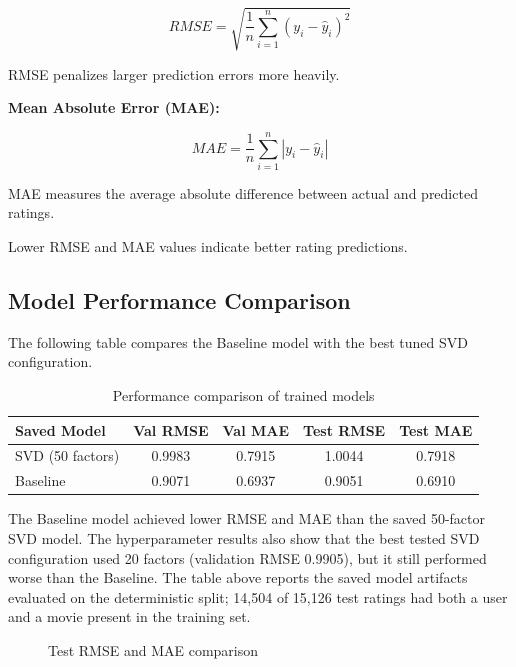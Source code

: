 \documentclass[11pt,a4paper]{article}
\begin{document}
\begin{equation}
RMSE = \sqrt{\frac{1}{n}\sum_{i=1}^{n}(y_i-\hat{y}_i)^2}
\end{equation}

RMSE penalizes larger prediction errors more heavily.

\textbf{Mean Absolute Error (MAE):}

\begin{equation}
MAE = \frac{1}{n}\sum_{i=1}^{n}|y_i-\hat{y}_i|
\end{equation}

MAE measures the average absolute difference between actual
and predicted ratings.

Lower RMSE and MAE values indicate better rating predictions.

\subsection{Model Performance Comparison}

The following table compares the Baseline model with the
best tuned SVD configuration.

\begin{table}[H]
\centering
\begin{tabular}{lcccc}
\toprule
\textbf{Saved Model} & \textbf{Val RMSE} & \textbf{Val MAE} &
\textbf{Test RMSE} & \textbf{Test MAE} \\
\midrule
SVD (50 factors) & 0.9983 & 0.7915 & 1.0044 & 0.7918 \\
Baseline & 0.9071 & 0.6937 & 0.9051 & 0.6910 \\
\bottomrule
\end{tabular}
\caption{Performance comparison of trained models}
\label{tab:model_comparison}
\end{table}

The Baseline model achieved lower RMSE and MAE than the saved
50-factor SVD model. The hyperparameter results also show that
the best tested SVD configuration used 20 factors (validation
RMSE 0.9905), but it still performed worse than the Baseline.
The table above reports the saved model artifacts evaluated on
the deterministic split; 14,504 of 15,126 test ratings had both
a user and a movie present in the training set.

\begin{figure}[H]
\centering
{}
\caption{Test RMSE and MAE comparison}
\label{fig:model_comparison}
\end{figure}
\end{document}
